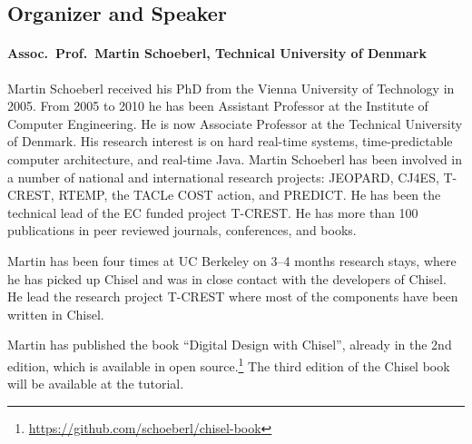 \documentclass{article}
\begin{document}
\subsection*{Organizer and Speaker}

 
\paragraph{Assoc.~Prof.~Martin Schoeberl, Technical University of Denmark}

Martin Schoeberl received his PhD from the Vienna University of Technology in 2005. From 2005 to 2010 he has been Assistant Professor at the Institute of Computer Engineering. He is now Associate Professor at the Technical University of Denmark. His research interest is on hard real-time systems, time-predictable computer architecture, and real-time Java.  Martin Schoeberl has been involved in a number of national and international research projects: JEOPARD, CJ4ES, T-CREST, RTEMP, the TACLe COST action, and PREDICT.  He has been the technical lead of the EC funded project T-CREST.  He has more than 100 publications in peer reviewed journals, conferences, and books.

Martin has been four times at UC Berkeley on 3--4 months research stays, where he has picked up Chisel and was in close contact with the developers of Chisel. He lead the research project T-CREST where most of the components have been written in Chisel.

Martin has published the book ``Digital Design with Chisel'', already in the 2nd edition,
which is available in open source.\footnote{\url{https://github.com/schoeberl/chisel-book}}
The third edition of the Chisel book will be available at the tutorial.

%
%
\end{document}
